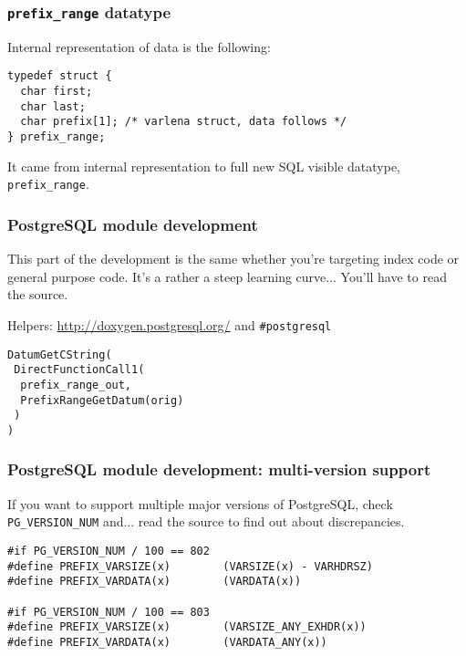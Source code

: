 \documentclass{beamer}
\begin{document}
\begin{frame}[fragile]
  \frametitle{\texttt{prefix\_range} datatype}

  Internal representation of data is the following:

  \begin{example}
  \begin{verbatim}
typedef struct {
  char first;
  char last;
  char prefix[1]; /* varlena struct, data follows */
} prefix_range;
  \end{verbatim}
  \end{example}

  It came from internal representation to full new SQL visible datatype,
  \texttt{prefix\_range}.
\end{frame}

\begin{frame}[fragile]
  \frametitle{PostgreSQL module development}

  This part of the development is the same whether you're targeting index
  code or general purpose code. It's a rather a steep learning
  curve... You'll have to read the source.

  Helpers: \url{http://doxygen.postgresql.org/} and \texttt{\#postgresql}

  \begin{example}
  \begin{verbatim}
DatumGetCString(
 DirectFunctionCall1(
  prefix_range_out,
  PrefixRangeGetDatum(orig)
 )
)
  \end{verbatim}
  \end{example}
\end{frame}

\begin{frame}[fragile]
  \frametitle{PostgreSQL module development: multi-version support}

  If you want to support multiple major versions of PostgreSQL, check
  \texttt{PG\_VERSION\_NUM} and... read the source to find out about
  discrepancies.

  \begin{example}
  \begin{verbatim}
#if PG_VERSION_NUM / 100 == 802
#define PREFIX_VARSIZE(x)        (VARSIZE(x) - VARHDRSZ)
#define PREFIX_VARDATA(x)        (VARDATA(x))

#if PG_VERSION_NUM / 100 == 803
#define PREFIX_VARSIZE(x)        (VARSIZE_ANY_EXHDR(x))
#define PREFIX_VARDATA(x)        (VARDATA_ANY(x))
  \end{verbatim}
  \end{example}
\end{frame}
\end{document}
